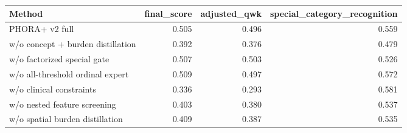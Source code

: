 \begin{tabular}{lrrr}
\toprule
Method & final_score & adjusted_qwk & special_category_recognition \\
\midrule
PHORA+ v2 full & 0.505 & 0.496 & 0.559 \\
w/o concept + burden distillation & 0.392 & 0.376 & 0.479 \\
w/o factorized special gate & 0.507 & 0.503 & 0.526 \\
w/o all-threshold ordinal expert & 0.509 & 0.497 & 0.572 \\
w/o clinical constraints & 0.336 & 0.293 & 0.581 \\
w/o nested feature screening & 0.403 & 0.380 & 0.537 \\
w/o spatial burden distillation & 0.409 & 0.387 & 0.535 \\
\bottomrule
\end{tabular}
